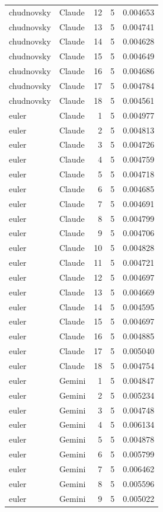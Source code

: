 \begin{longtable}{llrrr}
chudnovsky & Claude & 12 & 5 & 0.004653\\
chudnovsky & Claude & 13 & 5 & 0.004741\\
chudnovsky & Claude & 14 & 5 & 0.004628\\
chudnovsky & Claude & 15 & 5 & 0.004649\\
chudnovsky & Claude & 16 & 5 & 0.004686\\
chudnovsky & Claude & 17 & 5 & 0.004784\\
chudnovsky & Claude & 18 & 5 & 0.004561\\
euler & Claude & 1 & 5 & 0.004977\\
euler & Claude & 2 & 5 & 0.004813\\
euler & Claude & 3 & 5 & 0.004726\\
euler & Claude & 4 & 5 & 0.004759\\
euler & Claude & 5 & 5 & 0.004718\\
euler & Claude & 6 & 5 & 0.004685\\
euler & Claude & 7 & 5 & 0.004691\\
euler & Claude & 8 & 5 & 0.004799\\
euler & Claude & 9 & 5 & 0.004706\\
euler & Claude & 10 & 5 & 0.004828\\
euler & Claude & 11 & 5 & 0.004721\\
euler & Claude & 12 & 5 & 0.004697\\
euler & Claude & 13 & 5 & 0.004669\\
euler & Claude & 14 & 5 & 0.004595\\
euler & Claude & 15 & 5 & 0.004697\\
euler & Claude & 16 & 5 & 0.004885\\
euler & Claude & 17 & 5 & 0.005040\\
euler & Claude & 18 & 5 & 0.004754\\
euler & Gemini & 1 & 5 & 0.004847\\
euler & Gemini & 2 & 5 & 0.005234\\
euler & Gemini & 3 & 5 & 0.004748\\
euler & Gemini & 4 & 5 & 0.006134\\
euler & Gemini & 5 & 5 & 0.004878\\
euler & Gemini & 6 & 5 & 0.005799\\
euler & Gemini & 7 & 5 & 0.006462\\
euler & Gemini & 8 & 5 & 0.005596\\
euler & Gemini & 9 & 5 & 0.005022\\

\end{longtable}
